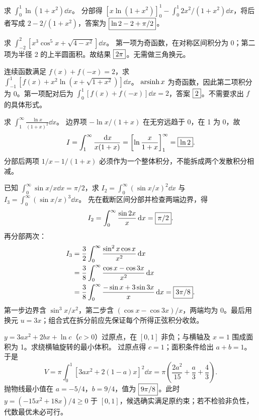 求 $\int_0^1\ln(1+x^2)\dd x$。
\sol 分部得 $[x\ln(1+x^2)]_0^1-\int_0^1 2x^2/(1+x^2)\dd x$，将后者写成 $2-2/(1+x^2)$，答案为 $\boxed{\ln2-2+\pi/2}$。

求 $\int_{-2}^2[x^3\cos^5x+\sqrt{4-x^2}]\dd x$。
\sol 第一项为奇函数，在对称区间积分为 0；第二项为半径 2 的上半圆面积。故结果 $\boxed{2\pi}$。无需做三角换元。

连续函数满足 $f(x)+f(-x)=2$，求 $\int_{-1}^1[f(x)+x^2\ln(x+\sqrt{1+x^2})]\dd x$。
\sol $\operatorname{arsinh} x$ 为奇函数，因此第二项积分为 0。第一项配对后为 $\int_0^1[f(x)+f(-x)]\dd x=2$，答案 $\boxed{2}$。不需要求出 $f$ 的具体形式。

求 $\int_1^\infty\frac{\ln x}{(1+x)^2}\dd x$。
\sol 边界项 $-\ln x/(1+x)$ 在无穷远趋于 0，在 1 为 0，故
\[I=\int_1^\infty\frac{\,\mathrm d x}{x(1+x)}
=\left[\ln\frac{x}{1+x}\right]_1^\infty=\boxed{\ln2}.\]
分部后两项 $1/x-1/(1+x)$ 必须作为一个整体积分，不能拆成两个发散积分相减。

已知 $\int_0^\infty\sin x/x\dd x=\pi/2$，求 $I_2=\int_0^\infty(\sin x/x)^2\dd x$ 与 $I_3=\int_0^\infty(\sin x/x)^3\dd x$。
\sol 先在截断区间分部并检查两端边界，得
\[I_2=\int_0^\infty\frac{\sin2x}{x}\,\mathrm d x=\boxed{\pi/2}.\]
再分部两次：
\begin{align*}
I_3&=\frac32\int_0^\infty\frac{\sin^2x\cos x}{x^2}\,\mathrm d x\\
&=\frac38\int_0^\infty\frac{\cos x-\cos3x}{x^2}\,\mathrm d x\\
&=\frac38\int_0^\infty\frac{-\sin x+3\sin3x}{x}\,\mathrm d x
=\boxed{3\pi/8}.
\end{align*}
第一步边界含 $\sin^3x/x^2$，第二步含 $(\cos x-\cos3x)/x$，两端均为 0。最后用换元 $u=3x$；组合式在拆分前应先保证每个所得正弦积分收敛。

$y=3ax^2+2bx+\ln c$（$c>0$）过原点，在 $[0,1]$ 非负；与横轴及 $x=1$ 围成面积为 1。求绕横轴旋转的最小体积。
\sol 过原点得 $c=1$；面积条件给出 $a+b=1$。于是
\[V=\pi\int_0^1[3ax^2+2(1-a)x]^2\dd x
=\pi\left(\frac{2a^2}{15}+\frac a3+\frac43\right).\]
抛物线最小值在 $a=-5/4$，$b=9/4$，值为 $\boxed{9\pi/8}$。此时 $y=(-15x^2+18x)/4\ge0$ 于 $[0,1]$，候选确实满足原约束；若不检验非负性，代数最优未必可行。
